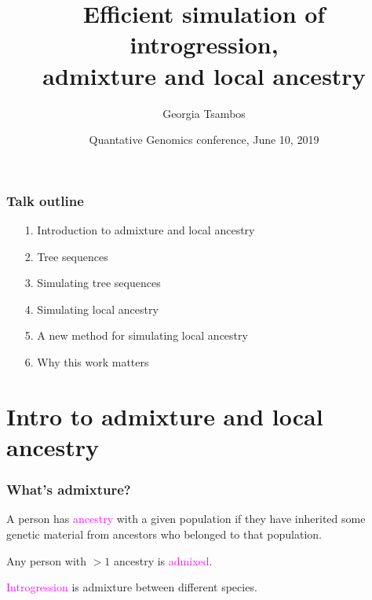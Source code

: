 \documentclass[11pt, mathserif, aspectratio=169]{beamer}
\title{Efficient simulation of introgression,\\ admixture and local ancestry}
\author{Georgia Tsambos}
\date{Quantative Genomics conference, June 10, 2019}
\newcommand{\magenta}[1]{\textcolor{magenta}{#1}}
\newenvironment{wideitemize}{\itemize\addtolength{\itemsep}{10pt}}{\enditemize}
\begin{document}
\maketitle

\begin{frame}
\frametitle{Talk outline}

\begin{enumerate}
\itemsep4mm
\item[1. ] Introduction to admixture and local ancestry
\item[2. ] Tree sequences
\item[3. ] Simulating tree sequences
\item[4. ] Simulating local ancestry
\item[5. ] A new method for simulating local ancestry
\item[6. ] Why this work matters
\end{enumerate}
\end{frame}

\section{Intro to admixture and local ancestry}


\begin{frame}
\frametitle{What's admixture?}
%

\begin{wideitemize}
    \item A person has \magenta{ancestry} with a given population if they have inherited some genetic material from ancestors who belonged to that population. 
    \item Any person with $>1$ ancestry is \magenta{admixed}.
    \item \magenta{Introgression} is admixture between different species.
\end{wideitemize}

\end{frame}
\end{document}
